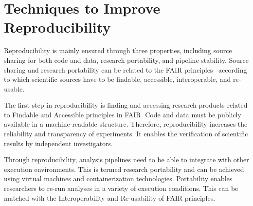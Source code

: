 

\section{Techniques to Improve Reproducibility}
\label{techniques}

Reproducibility is mainly ensured through three properties, including 
source sharing for both code and data, 
research portability, and pipeline 
stability. Source sharing and research portability can be related to 
the FAIR principles~\cite{wilkinson2016fair} according to which 
scientific sources have to be findable, accessible, interoperable, and 
re-usable. 

The first step in reproducibility is finding and accessing research products
related to Findable and Accessible principles in FAIR.
Code and data must be publicly available in a 
machine-readable structure. Therefore, reproducibility 
increases the reliability and transparency of experiments. 
It enables the verification of scientific 
results by independent investigators. 

Through reproducibility, analysis pipelines need to be able to 
integrate with other execution environments. This is termed research 
portability and can be achieved using virtual machines and 
containerization technologies. Portability enables researchers to 
re-run analyses in a variety of execution conditions. This can be 
matched with the Interoperability and Re-usability of FAIR principles. 

